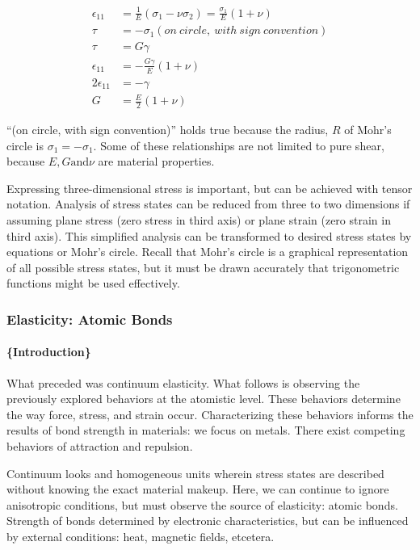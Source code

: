 \documentclass[
]{article}
\begin{document}
\begin{align}
\epsilon_{11} &= \frac{1}{E}(\sigma_{1} - \nu\sigma_{2}) = \frac{\sigma_{1}}{E}(1 + \nu) \\
\tau &= -\sigma_{1} (on~circle,~with~sign~convention) \\
\tau &= G\gamma \\
\epsilon_{11} &= -\frac{G\gamma}{E}(1 + \nu) \\
2\epsilon_{11} &= -\gamma \\
G &= \frac{E}{2}(1 + \nu)
\end{align}

``(on circle, with sign convention)'' holds true because the radius,
\(R\) of Mohr's circle is \(\sigma_{1} = - \sigma_{1}\). Some of these
relationships are not limited to pure shear, because
\(E, G \text{and} \nu\) are material properties.

Expressing three-dimensional stress is important, but can be achieved
with tensor notation. Analysis of stress states can be reduced from
three to two dimensions if assuming plane stress (zero stress in third
axis) or plane strain (zero strain in third axis). This simplified
analysis can be transformed to desired stress states by equations or
Mohr's circle. Recall that Mohr's circle is a graphical representation
of all possible stress states, but it must be drawn accurately that
trigonometric functions might be used effectively.

\hypertarget{elasticity-atomic-bonds}{%
\subsubsection{Elasticity: Atomic Bonds}\label{elasticity-atomic-bonds}}

\hypertarget{introduction-3}{%
\paragraph{\{Introduction\}}\label{introduction-3}}

What preceded was continuum elasticity. What follows is observing the
previously explored behaviors at the atomistic level. These behaviors
determine the way force, stress, and strain occur. Characterizing these
behaviors informs the results of bond strength in materials: we focus on
metals. There exist competing behaviors of attraction and repulsion.

Continuum looks and homogeneous units wherein stress states are
described without knowing the exact material makeup. Here, we can
continue to ignore anisotropic conditions, but must observe the source
of elasticity: atomic bonds. Strength of bonds determined by electronic
characteristics, but can be influenced by external conditions: heat,
magnetic fields, etcetera.
\end{document}
